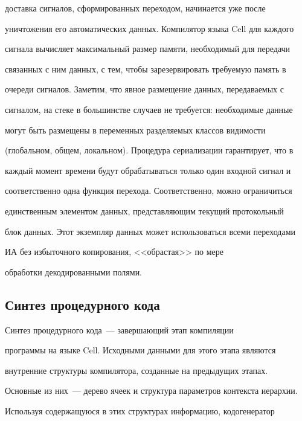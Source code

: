 \begin{enumerate}[1.]
доставка сигналов, сформированных переходом, начинается уже после 


уничтожения его автоматических данных. Компилятор языка Cell для каждого 


сигнала вычисляет максимальный размер памяти, необходимый для передачи 


связанных с ним данных, с тем, чтобы зарезервировать требуемую память в 


очереди сигналов. Заметим, что явное размещение данных, передаваемых с 


сигналом, на стеке в большинстве случаев не требуется: необходимые данные 


могут быть размещены в переменных разделяемых классов видимости 


(глобальном, общем, локальном). Процедура сериализации гарантирует, что в 


каждый момент времени будут обрабатываться только один входной сигнал и 


соответственно одна функция перехода. Соответственно, можно ограничиться 


единственным элементом данных, представляющим текущий протокольный 


блок данных. Этот экземпляр данных может использоваться всеми переходами 


ИА без избыточного копирования, <<обрастая>> по мере 


обработки декодированными полями.


     \end{enumerate}


     


\subsection{Синтез процедурного кода}


      


      Синтез процедурного кода~--- завершающий этап компиляции 


программы на языке Cell. Исходными данными для этого этапа являются 


внутренние структуры компилятора, созданные на предыдущих этапах. 


Основные из них~--- дерево ячеек и структура параметров контекста иерархии. 


Используя содержащуюся в этих структурах информацию, кодогенератор 


